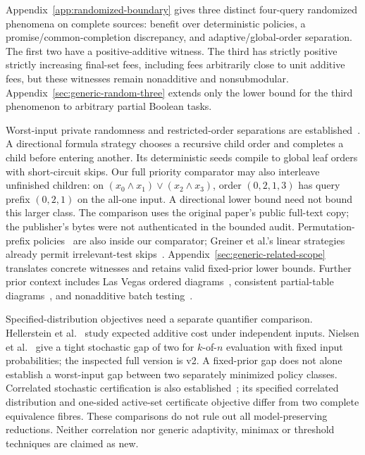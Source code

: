 \documentclass[pdflatex,sn-mathphys-num]{sn-jnl}
\theoremstyle{thmstyleone}
\theoremstyle{thmstylethree}
\theoremstyle{thmstyletwo}
\begin{document}
Appendix~\ref{app:randomized-boundary} gives three distinct four-query randomized phenomena on complete sources: benefit over deterministic policies, a promise/common-completion discrepancy, and adaptive/global-order separation. The first two have a positive-additive witness. The third has strictly positive strictly increasing final-set fees, including fees arbitrarily close to unit additive fees, but these witnesses remain nonadditive and nonsubmodular. Appendix~\ref{sec:generic-random-three} extends only the lower bound for the third phenomenon to arbitrary partial Boolean tasks.

Worst-input private randomness and restricted-order separations are established~\cite{amano2011directional}. A directional formula strategy chooses a recursive child order and completes a child before entering another. Its deterministic seeds compile to global leaf orders with short-circuit skips. Our full priority comparator may also interleave unfinished children: on $(x_0\wedge x_1)\vee(x_2\wedge x_3)$, order $(0,2,1,3)$ has query prefix $(0,2,1)$ on the all-one input. A directional lower bound need not bound this larger class. The comparison uses the original paper's public full-text copy; the publisher's bytes were not authenticated in the bounded audit. Permutation-prefix policies~\cite{hellerstein2022adaptivity} are also inside our comparator; Greiner et al.'s linear strategies already permit irrelevant-test skips~\cite{greiner}. Appendix~\ref{sec:generic-related-scope} translates concrete witnesses and retains valid fixed-prior lower bounds. Further prior context includes Las Vegas ordered diagrams~\cite{karpinski1999}, consistent partial-table diagrams~\cite{kristensen2006}, and nonadditive batch testing~\cite{harris2025}.

Specified-distribution objectives need a separate quantifier comparison.
Hellerstein et al.~\cite{hellerstein2022adaptivity} study expected additive
cost under independent inputs. Nielsen et al.~\cite{nielsen2025kofn}
give a tight stochastic gap of two for $k$-of-$n$ evaluation with fixed
input probabilities; the inspected full version is v2. A fixed-prior
gap does not alone establish a worst-input gap between two separately
minimized policy classes. Correlated stochastic certification is also
established~\cite{ghuge2026correlations}; its specified correlated
distribution and one-sided active-set certificate objective differ from
two complete equivalence fibres. These comparisons do not rule out all
model-preserving reductions. Neither correlation nor generic adaptivity,
minimax or threshold techniques are claimed as new.
\end{document}
